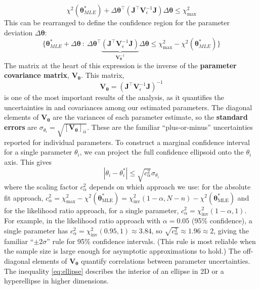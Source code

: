 \begin{equation}
    \chi^2(\boldsymbol{\theta}^*_{MLE}) + \Delta\boldsymbol{\theta}^\top \left( \mathbf{J}^\top \mathbf{V}_\epsilon^{-1} \mathbf{J} \right) \Delta\boldsymbol{\theta} \leq \chi^2_{\text{max}}
\end{equation}
This can be rearranged to define the confidence region for the parameter deviation $\Delta\boldsymbol{\theta}$:
\begin{equation}
    \{ \boldsymbol{\theta}^*_{MLE} + \Delta\boldsymbol{\theta} \ : \ \Delta\boldsymbol{\theta}^\top \underbrace{\left( \mathbf{J}^\top \mathbf{V}_\epsilon^{-1} \mathbf{J} \right)}_{\mathbf{V}_{\boldsymbol{\theta}}^{-1}} \Delta\boldsymbol{\theta} \leq \chi^2_{\text{max}} - \chi^2(\boldsymbol{\theta}^*_{MLE}) \}
    \label{eq:ellipse}
\end{equation}
The matrix at the heart of this expression is the inverse of the \textbf{parameter covariance matrix}, $\mathbf{V}_{\boldsymbol{\theta}}$. This matrix, 
\begin{equation}
    \mathbf{V}_{\boldsymbol{\theta}} = (\mathbf{J}^\top \mathbf{V}_\epsilon^{-1} \mathbf{J})^{-1}
    \label{eq:parameter-covariance-matrix}
\end{equation}
is one of the most important results of the analysis, as it quantifies the uncertainties in and covariances among our estimated parameters. The diagonal elements of $\mathbf{V}_{\boldsymbol{\theta}}$ are the variances of each parameter estimate, so the \textbf{standard errors} are $\sigma_{\theta_i} = \sqrt{[\mathbf{V}_{\boldsymbol{\theta}}]_{ii}}$. These are the familiar ``plus-or-minus'' uncertainties reported for individual parameters. To construct a marginal confidence interval for a single parameter $\theta_i$, we can project the full confidence ellipsoid onto the $\theta_i$ axis. This gives
\begin{equation}
    |\theta_i - \theta_i^*| \leq \sqrt{c_\alpha^2} \sigma_{\theta_i}
\end{equation}
where the scaling factor $c_\alpha^2$ depends on which approach we use: for the absolute fit approach, $c_\alpha^2 = \chi^2_{\text{max}} - \chi^2(\boldsymbol{\theta}^*_{\text{MLE}}) = \chi^2_{\text{inv}}(1-\alpha, N-n) - \chi^2(\boldsymbol{\theta}^*_{\text{MLE}})$ and for the likelihood ratio approach, for a single parameter, $c_\alpha^2 = \chi^2_{\text{inv}}(1-\alpha, 1)$. For example, in the likelihood ratio approach with $\alpha = 0.05$ (95\% confidence), a single parameter has $c_\alpha^2 = \chi^2_{\text{inv}}(0.95, 1) \approx 3.84$, so $\sqrt{c_\alpha^2} \approx 1.96 \approx 2$, giving the familiar ``$\pm 2\sigma$'' rule for 95\% confidence intervals. (This rule is most reliable when the sample size is large enough for asymptotic approximations to hold.) The off-diagonal elements of $\mathbf{V}_{\boldsymbol{\theta}}$ quantify correlations between parameter uncertainties. The inequality \autoref{eq:ellipse} describes the interior of an ellipse in 2D or a hyperellipse in higher dimensions.

